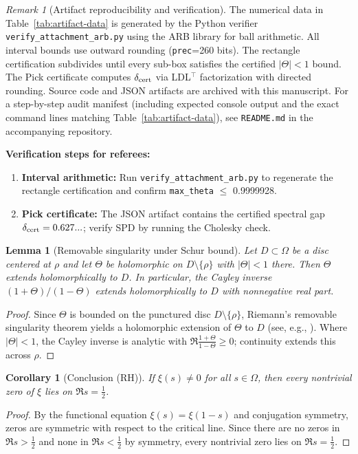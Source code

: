 \documentclass[11pt]{article}
\newtheorem{lemma}[theorem]{Lemma}
\newtheorem{corollary}[theorem]{Corollary}
\theoremstyle{definition}
\theoremstyle{remark}
\newtheorem{remark}[theorem]{Remark}
\theoremstyle{definition}
\begin{document}
\begin{remark}[Artifact reproducibility and verification]\label{rem:artifact-repro}
The numerical data in Table~\ref{tab:artifact-data} is generated by the Python verifier \texttt{verify\_attachment\_arb.py} using the ARB library for ball arithmetic.
All interval bounds use outward rounding (\texttt{prec}=260 bits).
The rectangle certification subdivides until every sub-box satisfies the certified $|\Theta| < 1$ bound.
The Pick certificate computes $\delta_{\rm cert}$ via LDL$^\top$ factorization with directed rounding.
Source code and JSON artifacts are archived with this manuscript.
For a step-by-step audit manifest (including expected console output and the exact command lines matching Table~\ref{tab:artifact-data}), see \texttt{README.md} in the accompanying repository.

\textbf{Verification steps for referees:}
\begin{enumerate}
\item \textbf{Interval arithmetic:} Run \texttt{verify\_attachment\_arb.py} to regenerate the rectangle certification and confirm \texttt{max\_theta} $\le$ 0.9999928.
\item \textbf{Pick certificate:} The JSON artifact contains the certified spectral gap $\delta_{\rm cert} = 0.627...$; verify SPD by running the Cholesky check.
\end{enumerate}
\end{remark}

\begin{lemma}[Removable singularity under Schur bound]\label{lem:removable-schur}
Let $D\subset\Omega$ be a disc centered at $\rho$ and let $\Theta$ be holomorphic on $D\setminus\{\rho\}$ with $|\Theta|<1$ there. Then $\Theta$ extends holomorphically to $D$. In particular, the Cayley inverse $(1+\Theta)/(1-\Theta)$ extends holomorphically to $D$ with nonnegative real part.
\end{lemma}
\begin{proof}
Since $\Theta$ is bounded on the punctured disc $D\setminus\{\rho\}$, Riemann's removable singularity theorem yields a holomorphic extension of $\Theta$ to $D$ (see, e.g., \cite{RudinRCA}). Where $|\Theta|<1$, the Cayley inverse is analytic with $\Re\tfrac{1+\Theta}{1-\Theta}\ge 0$; continuity extends this across $\rho$.
\end{proof}



\begin{corollary}[Conclusion (RH)]\label{cor:RH}
If $\xi(s)\neq 0$ for all $s\in\Omega$, then every nontrivial zero of $\xi$ lies on $\Re s=\tfrac12$.
\end{corollary}
\begin{proof}
By the functional equation $\xi(s)=\xi(1-s)$ and conjugation symmetry, zeros are symmetric with respect to the critical line. Since there are no zeros in $\Re s>\tfrac12$ and none in $\Re s<\tfrac12$ by symmetry, every nontrivial zero lies on $\Re s=\tfrac12$.
\end{proof}
\end{document}
